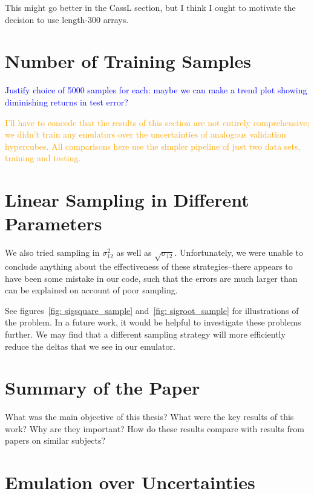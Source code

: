 This might go better in the CassL section, but I think I ought to motivate the 
decision to use length-300 arrays.

\section{Number of Training Samples}
\label{sec: num_samples}

\textcolor{blue}{Justify choice of 5000 samples for each: maybe we can make a
trend plot showing diminishing returns in test error?}


\textcolor{orange}{I'll have to concede that the results of this section are 
not entirely comprehensive; we didn't train any emulators over the 
uncertainties of analogous validation hypercubes. All comparisons here use the 
simpler pipeline of just two data sets, training and testing.}


\section{Linear Sampling in Different Parameters}

We also tried sampling in $\sigma_{12}^2$ as well as $\sqrt{\sigma_{12}}$.
Unfortunately, we were unable to conclude anything about the effectiveness of
these strategies--there appears to have been some mistake in our code, such
that the errors are much larger than can be explained on account of poor
sampling.

See figures~\ref{fig: sigsquare_sample} and~\ref{fig: sigroot_sample} for
illustrations of the problem. In a future work, it would be helpful to
investigate these problems further. We may find that a different sampling
strategy will more efficiently reduce the deltas that we see in our emulator.

\section{Summary of the Paper}

What was the main objective of this thesis? What were the key results of this 
work? Why are they important? How do these results compare with results from 
papers on similar subjects?

\section{Emulation over Uncertainties}


